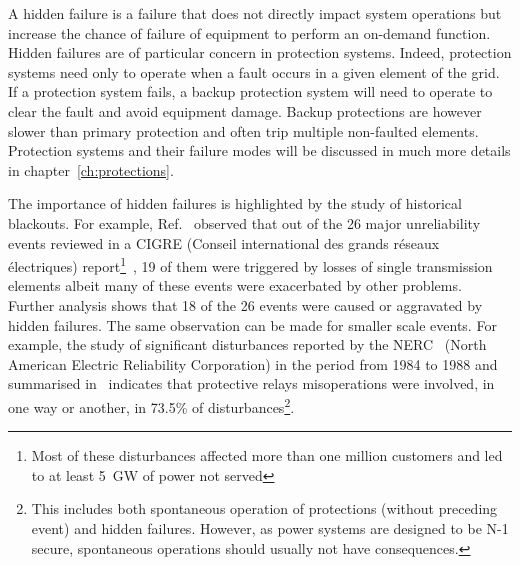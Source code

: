 A hidden failure is a failure that does not directly impact system operations but increase the chance of failure of equipment to perform an on-demand function. Hidden failures are of particular concern in protection systems. Indeed, protection systems need only to operate when a fault occurs in a given element of the grid. If a protection system fails, a backup protection system will need to operate to clear the fault and avoid equipment damage. Backup protections are however slower than primary protection and often trip multiple non-faulted elements. Protection systems and their failure modes will be discussed in much more details in chapter~\ref{ch:protections}.


The importance of hidden failures is highlighted by the study of historical blackouts. For example, Ref.~\cite{CascadingMethodoAndChallenges} observed that out of the 26 major unreliability events reviewed in a CIGRE (Conseil international des grands réseaux électriques) report\footnote{Most of these disturbances affected more than one million customers and led to at least 5~GW of power not served}~\cite{majorBlackouts}, 19 of them were triggered by losses of single transmission elements albeit many of these events were exacerbated by other problems. Further analysis shows that 18 of the 26 events were caused or aggravated by hidden failures. The same observation can be made for smaller scale events. For example, the study of significant disturbances reported by the NERC~\cite{NERCDisturbancesReport} (North American Electric Reliability Corporation) in the period from 1984 to 1988 and summarised in~\cite{ZoneVulnerability} indicates that protective relays misoperations were involved, in one way or another, in 73.5\% of disturbances\footnote{This includes both spontaneous operation of protections (without preceding event) and hidden failures. However, as power systems are designed to be N-1 secure, spontaneous operations should usually not have consequences.}.

